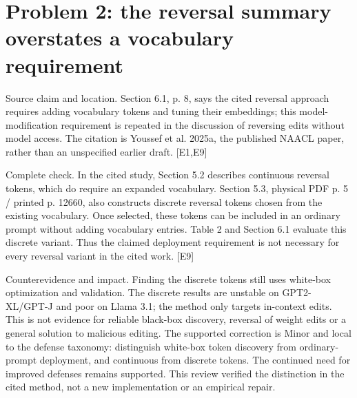 \documentclass[10pt]{article}
\begin{document}
\section*{Problem 2: the reversal summary overstates a vocabulary requirement}
Source claim and location. Section 6.1, p. 8, says the cited reversal approach requires adding vocabulary tokens and tuning their embeddings; this model-modification requirement is repeated in the discussion of reversing edits without model access. The citation is Youssef et al. 2025a, the published NAACL paper, rather than an unspecified earlier draft. [E1,E9]\par
Complete check. In the cited study, Section 5.2 describes continuous reversal tokens, which do require an expanded vocabulary. Section 5.3, physical PDF p. 5 / printed p. 12660, also constructs discrete reversal tokens chosen from the existing vocabulary. Once selected, these tokens can be included in an ordinary prompt without adding vocabulary entries. Table 2 and Section 6.1 evaluate this discrete variant. Thus the claimed deployment requirement is not necessary for every reversal variant in the cited work. [E9]\par
Counterevidence and impact. Finding the discrete tokens still uses white-box optimization and validation. The discrete results are unstable on GPT2-XL/GPT-J and poor on Llama 3.1; the method only targets in-context edits. This is not evidence for reliable black-box discovery, reversal of weight edits or a general solution to malicious editing. The supported correction is Minor and local to the defense taxonomy: distinguish white-box token discovery from ordinary-prompt deployment, and continuous from discrete tokens. The continued need for improved defenses remains supported. This review verified the distinction in the cited method, not a new implementation or an empirical repair.\par
\end{document}
